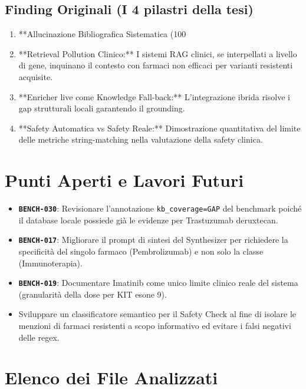 \documentclass[12pt, a4paper]{article}
\newcommand{\bench}[1]{{\texttt{\textbf{#1}}}}
\begin{document}
\subsection{Finding Originali (I 4 pilastri della tesi)}
\begin{enumerate}[leftmargin=1.6em, itemsep=3pt]
  \item **Allucinazione Bibliografica Sistematica (100%
  \item **Retrieval Pollution Clinico:** I sistemi RAG clinici, se interpellati a livello di gene, inquinano il contesto con farmaci non efficaci per varianti resistenti acquisite.
  \item **Enricher live come Knowledge Fall-back:** L'integrazione ibrida risolve i gap strutturali locali garantendo il grounding.
  \item **Safety Automatica vs Safety Reale:** Dimostrazione quantitativa del limite delle metriche string-matching nella valutazione della safety clinica.
\end{enumerate}

\section{Punti Aperti e Lavori Futuri}
\begin{itemize}[label=$\square$, leftmargin=2em, itemsep=4pt]
  \item \bench{BENCH-030}: Revisionare l'annotazione \texttt{kb\_coverage=GAP} del benchmark poiché il database locale possiede già le evidenze per Trastuzumab deruxtecan.
  \item \bench{BENCH-017}: Migliorare il prompt di sintesi del Synthesizer per richiedere la specificità del singolo farmaco (Pembrolizumab) e non solo la classe (Immunoterapia).
  \item \bench{BENCH-019}: Documentare Imatinib come unico limite clinico reale del sistema (granularità della dose per KIT esone 9).
  \item Sviluppare un classificatore semantico per il Safety Check al fine di isolare le menzioni di farmaci resistenti a scopo informativo ed evitare i falsi negativi delle regex.
\end{itemize}

\section{Elenco dei File Analizzati}
\end{document}
